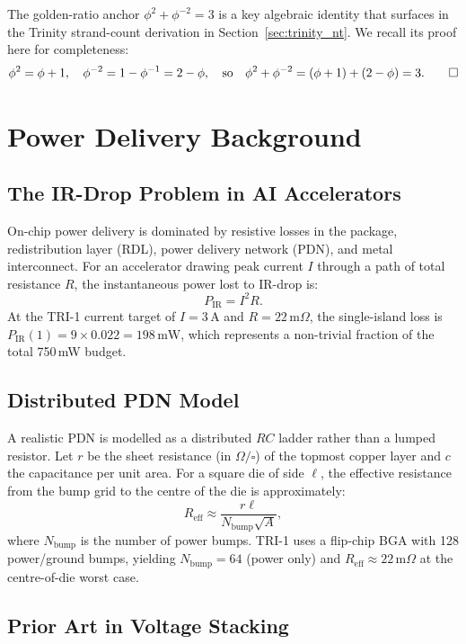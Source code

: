 The golden-ratio anchor \(\phi^2 + \phi^{-2} = 3\) is a key algebraic
identity that surfaces in the Trinity strand-count derivation in
Section~\ref{sec:trinity_nt}.  We recall its proof here for
completeness:
\[
  \phi^2 = \phi + 1, \quad \phi^{-2} = 1 - \phi^{-1} = 2 - \phi,
  \quad \text{so} \quad
  \phi^2 + \phi^{-2} = (\phi + 1) + (2 - \phi) = 3. \qed
\]

\section{Power Delivery Background}
\label{sec:pdb}

\subsection{The IR-Drop Problem in AI Accelerators}

On-chip power delivery is dominated by resistive losses in the
package, redistribution layer (RDL), power delivery network (PDN), and
metal interconnect.  For an accelerator drawing peak current $I$ through
a path of total resistance $R$, the instantaneous power lost to IR-drop is:
\[
  P_{\mathrm{IR}} = I^2 R.
\]
At the TRI-1 current target of $I = 3\,\mathrm{A}$ and $R = 22\,\mathrm{m}\Omega$,
the single-island loss is $P_{\mathrm{IR}}(1) = 9 \times 0.022 = 198\,\mathrm{mW}$,
which represents a non-trivial fraction of the total 750\,mW budget.

\subsection{Distributed PDN Model}

A realistic PDN is modelled as a distributed $RC$ ladder rather than a
lumped resistor.  Let $r$ be the sheet resistance (in $\Omega/\square$) of the
topmost copper layer and $c$ the capacitance per unit area.  For a square
die of side $\ell$, the effective resistance from the bump grid to the
centre of the die is approximately:
\[
  R_{\mathrm{eff}} \approx \frac{r \ell}{N_{\mathrm{bump}} \sqrt{A}},
\]
where $N_{\mathrm{bump}}$ is the number of power bumps.  TRI-1 uses a flip-chip
BGA with 128 power/ground bumps, yielding $N_{\mathrm{bump}} = 64$ (power only)
and $R_{\mathrm{eff}} \approx 22\,\mathrm{m}\Omega$ at the centre-of-die
worst case.

\subsection{Prior Art in Voltage Stacking}

